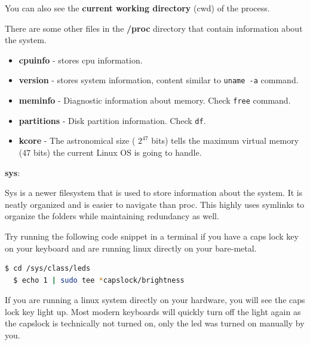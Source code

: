 You can also see the \textbf{current working directory} (cwd) of the process.

There are some other files in the \textbf{/proc} directory that contain information about the system.

\begin{itemize}
  \item \textbf{cpuinfo} - stores cpu information.
  \item \textbf{version} - stores system information, content similar to \texttt{uname -a} command.
  \item \textbf{meminfo} - Diagnostic information about memory. Check \texttt{free} command.
  \item \textbf{partitions} - Disk partition information. Check \texttt{df}.
  \item \textbf{kcore} - The astronomical size ( $2^{47}$ bits) tells the maximum virtual memory (47 bits) the current Linux OS is going to handle.
\end{itemize}

\textbf{sys}:

Sys is a newer filesystem that is used to store information about the system.
It is neatly organized and is easier to navigate than proc.
This highly uses symlinks to organize the folders while maintaining redundancy as well.

Try running the following code snippet in a terminal if you have a caps lock key on your keyboard and are running linux directly on your bare-metal.

\begin{lstlisting}[language=bash]
  $ cd /sys/class/leds
  $ echo 1 | sudo tee *capslock/brightness
\end{lstlisting}

If you are running a linux system directly on your hardware, you will see the caps lock key light up.
Most modern keyboards will quickly turn off the light again as the capslock is technically not turned on, only the led was turned on manually by you.

